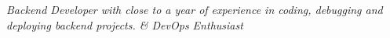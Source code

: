 





\textit{Backend Developer with close to a year of experience in coding, debugging and deploying backend projects. \& DevOps Enthusiast
}


